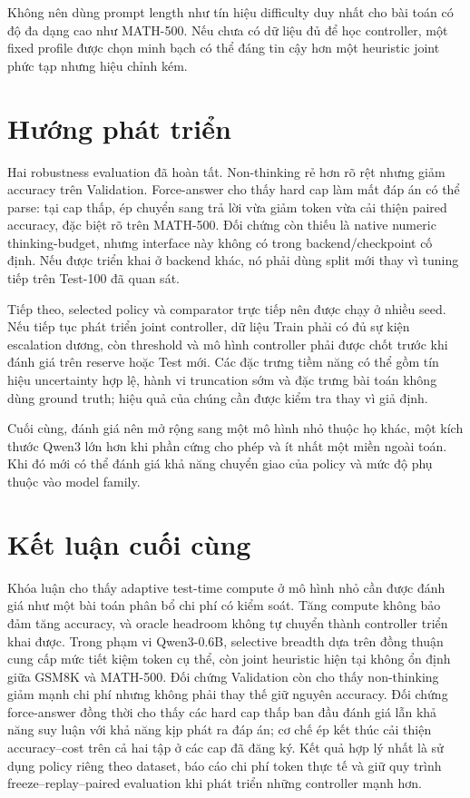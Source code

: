 Không nên dùng prompt length như tín hiệu difficulty duy nhất cho bài toán có
độ đa dạng cao như MATH-500. Nếu chưa có dữ liệu đủ để học controller, một
fixed profile được chọn minh bạch có thể đáng tin cậy hơn một heuristic joint
phức tạp nhưng hiệu chỉnh kém.

\section{Hướng phát triển}

Hai robustness evaluation đã hoàn tất. Non-thinking rẻ hơn rõ rệt nhưng giảm
accuracy trên Validation. Force-answer cho thấy hard cap làm mất đáp án có thể
parse: tại cap thấp, ép chuyển sang trả lời vừa giảm token vừa cải thiện paired
accuracy, đặc biệt rõ trên MATH-500. Đối chứng còn thiếu là native numeric
thinking-budget, nhưng interface này không có trong backend/checkpoint cố định.
Nếu được triển khai ở backend khác, nó phải dùng split mới thay vì tuning tiếp
trên Test-100 đã quan sát.

Tiếp theo, selected policy và comparator trực tiếp nên được chạy ở nhiều seed.
Nếu tiếp tục phát triển joint controller, dữ liệu Train phải có đủ sự kiện
escalation dương, còn threshold và mô hình controller phải được chốt trước khi
đánh giá trên reserve hoặc Test mới. Các đặc trưng tiềm năng có thể gồm tín
hiệu uncertainty hợp lệ, hành vi truncation sớm và đặc trưng bài toán không
dùng ground truth; hiệu quả của chúng cần được kiểm tra thay vì giả định.

Cuối cùng, đánh giá nên mở rộng sang một mô hình nhỏ thuộc họ khác, một kích
thước Qwen3 lớn hơn khi phần cứng cho phép và ít nhất một miền ngoài toán. Khi
đó mới có thể đánh giá khả năng chuyển giao của policy và mức độ phụ thuộc vào
model family.

\section{Kết luận cuối cùng}

Khóa luận cho thấy adaptive test-time compute ở mô hình nhỏ cần được đánh giá
như một bài toán phân bổ chi phí có kiểm soát. Tăng compute không bảo đảm tăng
accuracy, và oracle headroom không tự chuyển thành controller triển khai được.
Trong phạm vi Qwen3-0.6B, selective breadth dựa trên đồng thuận cung cấp mức
tiết kiệm token cụ thể, còn joint heuristic hiện tại không ổn định giữa GSM8K
và MATH-500. Đối chứng Validation còn cho thấy non-thinking giảm mạnh chi phí
nhưng không phải thay thế giữ nguyên accuracy. Đối chứng force-answer đồng thời
cho thấy các hard cap thấp ban đầu đánh giá lẫn khả năng suy luận với khả năng
kịp phát ra đáp án; cơ chế ép kết thúc cải thiện accuracy--cost trên cả hai tập
ở các cap đã đăng ký. Kết quả hợp lý nhất là sử dụng policy riêng theo dataset,
báo cáo chi phí token thực tế và giữ quy trình freeze--replay--paired evaluation
khi phát triển những controller mạnh hơn.
